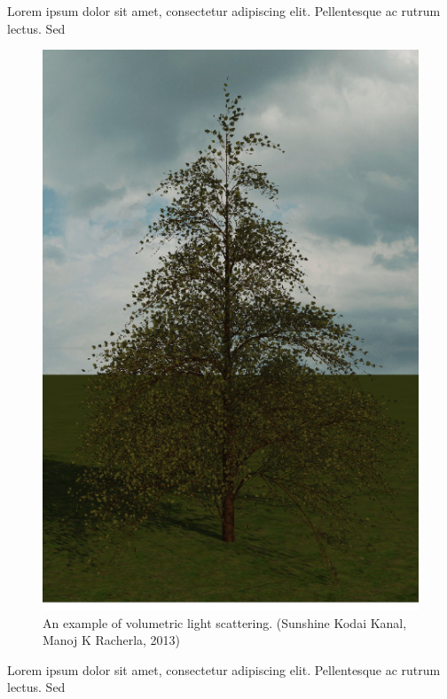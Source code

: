 \documentclass{article}
\begin{document}
  		Lorem ipsum dolor sit amet, consectetur adipiscing elit. Pellentesque ac rutrum lectus. Sed 
  	
  		\begin{figure}[ht!]
  			\includegraphics[scale=0.3]{pine}
  			\caption{An example of volumetric light scattering. (Sunshine Kodai Kanal, Manoj K Racherla, 2013)}
  			\label{fig:pine}
  		\end{figure}
  	
  		Lorem ipsum dolor sit amet, consectetur adipiscing elit. Pellentesque ac rutrum lectus. Sed 
  	
\end{document}
